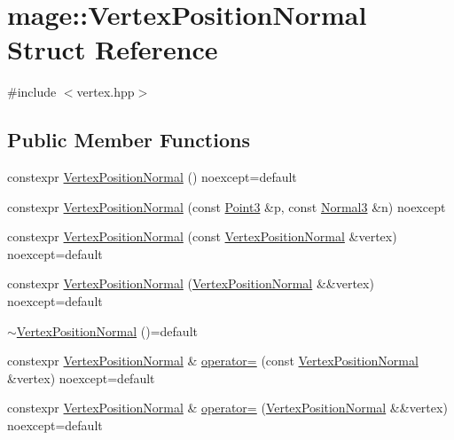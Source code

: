 \hypertarget{structmage_1_1_vertex_position_normal}{}\section{mage\+:\+:Vertex\+Position\+Normal Struct Reference}
\label{structmage_1_1_vertex_position_normal}


{\ttfamily \#include $<$vertex.\+hpp$>$}

\subsection*{Public Member Functions}
\begin{DoxyCompactItemize}
\item 
constexpr \hyperlink{structmage_1_1_vertex_position_normal_ab4a9d63bf68a8c3b867117eec117421e}{Vertex\+Position\+Normal} () noexcept=default
\item 
constexpr \hyperlink{structmage_1_1_vertex_position_normal_abfd18eec0148243507ba4d36b4298ea1}{Vertex\+Position\+Normal} (const \hyperlink{structmage_1_1_point3}{Point3} \&p, const \hyperlink{structmage_1_1_normal3}{Normal3} \&n) noexcept
\item 
constexpr \hyperlink{structmage_1_1_vertex_position_normal_a0f96915185d1761854453c98303da317}{Vertex\+Position\+Normal} (const \hyperlink{structmage_1_1_vertex_position_normal}{Vertex\+Position\+Normal} \&vertex) noexcept=default
\item 
constexpr \hyperlink{structmage_1_1_vertex_position_normal_a52257e1fb23713a7ce228a9d1ba66fac}{Vertex\+Position\+Normal} (\hyperlink{structmage_1_1_vertex_position_normal}{Vertex\+Position\+Normal} \&\&vertex) noexcept=default
\item 
\hyperlink{structmage_1_1_vertex_position_normal_a664123217b7e8d18769ea46fc318e0c1}{$\sim$\+Vertex\+Position\+Normal} ()=default
\item 
constexpr \hyperlink{structmage_1_1_vertex_position_normal}{Vertex\+Position\+Normal} \& \hyperlink{structmage_1_1_vertex_position_normal_a61c158d1c031a965b3512e217ac1dcff}{operator=} (const \hyperlink{structmage_1_1_vertex_position_normal}{Vertex\+Position\+Normal} \&vertex) noexcept=default
\item 
constexpr \hyperlink{structmage_1_1_vertex_position_normal}{Vertex\+Position\+Normal} \& \hyperlink{structmage_1_1_vertex_position_normal_aac2b96802bda78c0f312985d9602b103}{operator=} (\hyperlink{structmage_1_1_vertex_position_normal}{Vertex\+Position\+Normal} \&\&vertex) noexcept=default
\end{DoxyCompactItemize}
